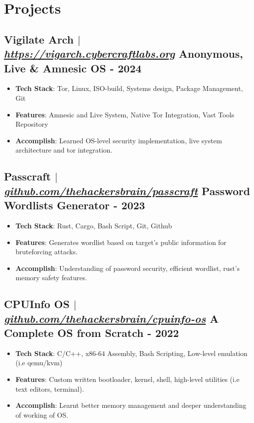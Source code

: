 \documentclass[11pt]{article} %
\begin{document}
\section{Projects}
\subsection{Vigilate Arch $|$ \normalfont\textit{\href{https://vigarch.cybercraftlabs.org/}{https://vigarch.cybercraftlabs.org}} \hfill Anonymous, Live \& Amnesic OS - \textbf{2024}}
\vspace{3pt}
\begin{itemize}
  \item \textbf{Tech Stack}: Tor, Linux, ISO-build, Systems design, Package Management, Git
  \item \textbf{Features}: Amnesic and Live System, Native Tor Integration, Vast Tools Repository
  \item \textbf{Accomplish}: Learned OS-level security implementation, live system architecture and tor integration.
\end{itemize}

\subsection{Passcraft $|$ \normalfont\textit{\href{https://github.com/thehackersbrain/passcraft}{github.com/thehackersbrain/passcraft}} \hfill Password Wordlists Generator - \textbf{2023}}
\vspace{3pt}
\begin{itemize}
  \item \textbf{Tech Stack}: Rust, Cargo, Bash Script, Git, Github
  \item \textbf{Features}: Generates wordlist based on target's public information for bruteforcing attacks.
  \item \textbf{Accomplish}: Understanding of password security, efficient wordlist, rust's memory safety features.
\end{itemize}

\subsection{CPUInfo OS $|$ \normalfont\textit{\href{https://github.com/thehackersbrain/cpuinfo-os}{github.com/thehackersbrain/cpuinfo-os}} \hfill A Complete OS from Scratch - \textbf{2022}}
\vspace{3pt}
\begin{itemize}
  \item \textbf{Tech Stack}: C/C++, x86-64 Assembly, Bash Scripting, Low-level emulation (i.e qemu/kvm)
  \item \textbf{Features}: Custom written bootloader, kernel, shell, high-level utilities (i.e text editors, terminal).
  \item \textbf{Accomplish}: Learnt better memory management and deeper understanding of working of OS.
\end{itemize}
\end{document}
